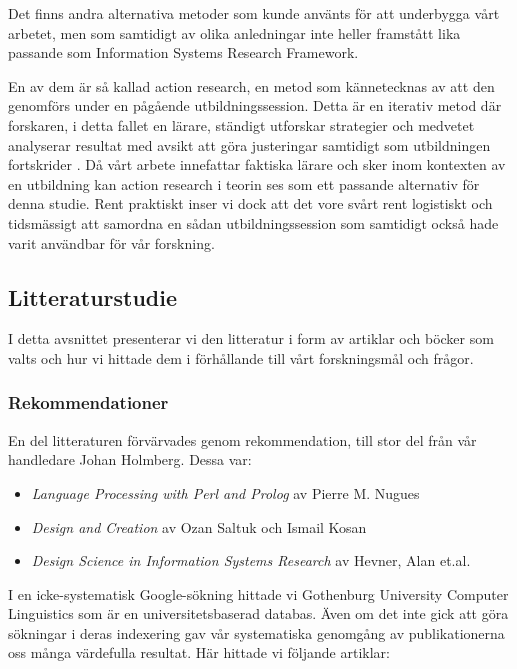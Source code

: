 \documentclass[swedish]{maucsthesis}
\begin{document}
Det finns andra alternativa metoder som kunde använts för att underbygga vårt
arbetet, men som samtidigt av olika anledningar inte heller framstått lika
passande som Information Systems Research Framework.

En av dem är så kallad action research, en metod som kännetecknas av att den
genomförs under en pågående utbildningssession. Detta är en iterativ metod där
forskaren, i detta fallet en lärare, ständigt utforskar strategier och medvetet
analyserar resultat med avsikt att göra justeringar samtidigt som utbildningen
fortskrider \citep{clement:2004}. Då vårt arbete innefattar faktiska lärare och
sker inom kontexten av en utbildning kan action research i teorin ses som ett
passande alternativ för denna studie. Rent praktiskt inser vi dock att det vore
svårt rent logistiskt och tidsmässigt att samordna en sådan utbildningssession
som samtidigt också hade varit användbar för vår forskning.

\subsection{Litteraturstudie}

I detta avsnittet presenterar vi den litteratur i form av artiklar och böcker
som valts och hur vi hittade dem i förhållande till vårt forskningsmål och
frågor.

\subsubsection{Rekommendationer}

En del litteraturen förvärvades genom rekommendation, till stor del från vår
handledare Johan Holmberg. Dessa var:
\begin{itemize}
\item \textit{Language Processing with Perl and Prolog} av Pierre M. Nugues
\item \textit{Design and Creation} av Ozan Saltuk och Ismail Kosan
\item \textit{Design Science in Information Systems Research} av Hevner, Alan et.al.
\end{itemize}

I en icke-systematisk Google-sökning hittade vi Gothenburg University Computer
Linguistics som är en universitetsbaserad databas. Även om det inte gick att
göra sökningar i deras indexering gav vår systematiska genomgång av
publikationerna oss många värdefulla resultat. Här hittade vi följande artiklar:
\end{document}
